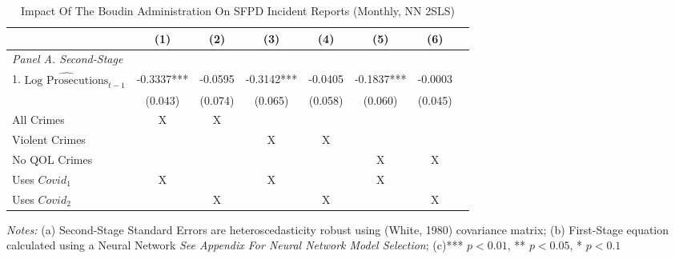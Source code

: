 \begin{table}[htbp]
  \centering
  \caption{Impact Of The Boudin Administration On SFPD Incident Reports (Monthly, NN 2SLS)}
  \label{tab:regression_incidents_nn}
  \begin{tabular}{lccccccc}
    \toprule
    & \multirow{1}{*}{(1)} & \multirow{1}{*}{(2)} & \multirow{1}{*}{(3)} & \multirow{1}{*}{(4)} & \multirow{1}{*}{(5)} & \multirow{1}{*}{(6)} \\
    \midrule
    \textit{Panel A. Second-Stage}  &   &   &  &  \\
    1. $\widehat{\text{Log Prosecutions}}_{t-1}$  & -0.3337*** & -0.0595 & -0.3142*** & -0.0405 & -0.1837*** & -0.0003 \\
     & (0.043) & (0.074) & (0.065) & (0.058) & (0.060) & (0.045) \\ \addlinespace
     All Crimes & X & X & & & & \\
     Violent Crimes & & & X & X & & \\
     No QOL Crimes & & & & & X & X \\
     Uses $Covid_1$ & X & & X & & X \\
     Uses $Covid_2$ & & X & & X & & X \\
    \bottomrule
  \end{tabular}

  \begin{flushleft}
    \textit{Notes:} (a) Second-Stage Standard Errors are heteroscedasticity robust using (White, 1980) covariance matrix; (b) First-Stage equation calculated using a Neural Network \textit{See Appendix For Neural Network Model Selection}; (c)*** $p<0.01$, ** $p<0.05$, * $p<0.1$
  \end{flushleft}
\end{table}